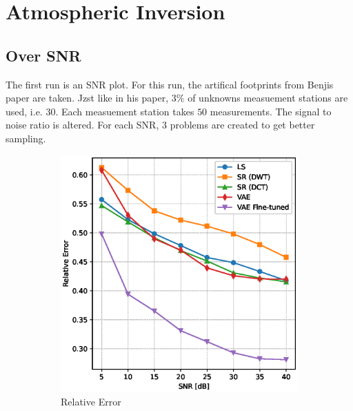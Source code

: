 \section{Atmospheric Inversion}
\subsection{Over SNR}
The first run is an SNR plot.
For this run, the artifical footprints from Benjis paper are taken.
Jzst like in his paper, $3\%$ of unknowns measuement stations are used, i.e. 30.
Each measuement station takes $50$ measurements.
The signal to noise ratio is altered.
For each SNR, 3 problems are created to get better sampling.
\begin{figure}
    \centering
    \begin{subfigure}[b]{0.49\textwidth}
        \includegraphics[width=\textwidth]{figures/06_results/snr_plots/munich_relative_error.eps}
        \caption{Relative Error}
    \end{subfigure}
    \begin{subfigure}[b]{0.49\textwidth}

\end{subfigure}
\end{figure}
